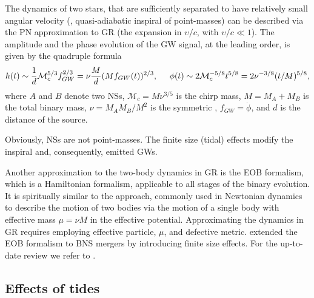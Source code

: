 The dynamics of two stars, that are sufficiently separated to have relatively small 
angular velocity (\ie, quasi-adiabatic inspiral of point-masses) 
can be described via the \ac{PN} approximation to \ac{GR} 
(the expansion in $\upsilon/c$, with $\upsilon/c\ll 1$).
%
The amplitude and the phase evolution of the \ac{GW} signal, at the leading order, 
is given by the quadruple formula \citep{Radice:2020ddv} 
%
\begin{equation}
\label{eq:intro:gw_wave}
h(t) \sim \frac{1}{d}\mathcal{M}_c^{5/3} f_{GW}^{2/3} = \nu\frac{M}{d}(Mf_{GW}(t))^{2/3}, \hspace{5mm} 
\phi(t) \sim 2\mathcal{M}_c^{-5/8}t^{5/8} = 2\nu^{-3/8}(t/M)^{5/8},
\end{equation}
%
where $A$ and $B$ denote two \acp{NS}, $\mathcal{M}_c = M\nu^{3/5}$ is the chirp mass, $M = M_A + M_B$ is the total binary mass, 
$\nu = M_A M_B/M^2$ is the symmetric \mr{}, $f_{GW} = \dot{\phi}$, and $d$ is the distance of the source.

Obviously, \acp{NS} are not point-masses. The finite size (tidal) effects modify the 
inspiral and, consequently, emitted \acp{GW}. 
%

Another approximation to the two-body dynamics in \ac{GR} is the \ac{EOB} formalism,
which is a Hamiltonian formalism, applicable to all stages of the binary evolution.
It is spiritually similar to the approach, commonly used in Newtonian dynamics to 
describe the motion of two bodies via the motion of a single body with effective mass 
$\mu=\nu M$ in the effective potential. Approximating the dynamics in \ac{GR} requires 
employing effective particle, $\mu$, and defective metric. 
%
\citet{Damour:2009wj} extended the \ac{EOB} formalism to \ac{BNS} mergers by 
introducing finite size effects. For the up-to-date review we refer to \citet{Damour:2012mv}.


\subsection{Effects of tides}


